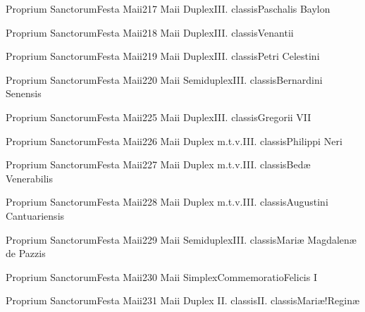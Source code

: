 \documentclass[liber-responsorialis_aestivus.tex]{subfiles}
\begin{document}
	{Proprium Sanctorum}{Festa Maii}{2}{17 Maii}
	{Duplex}{III. classis}{Paschalis Baylon}
	{\conprubric}
	{\respdetemp}

	{Proprium Sanctorum}{Festa Maii}{2}{18 Maii}
	{Duplex}{III. classis}{Venantii}
	{\mrtprubric}
	{\respdetemp}

	{Proprium Sanctorum}{Festa Maii}{2}{19 Maii}
	{Duplex}{III. classis}{Petri Celestini}
	{\coporubric}
	{\respdetemp}

	{Proprium Sanctorum}{Festa Maii}{2}{20 Maii}
	{Semiduplex}{III. classis}{Bernardini Senensis}
	{\conprubric}
	{\respdetemp}

	{Proprium Sanctorum}{Festa Maii}{2}{25 Maii}
	{Duplex}{III. classis}{Gregorii VII}
	{\coporubric}
	{\respdetemp}

	{Proprium Sanctorum}{Festa Maii}{2}{26 Maii}
	{Duplex m.t.v.}{III. classis}{Philippi Neri}
	{\conprubric}
	{\respdetemp}

	{Proprium Sanctorum}{Festa Maii}{2}{27 Maii}
	{Duplex m.t.v.}{III. classis}{Bedæ Venerabilis}
	{\conpdorubric}
	{\respdetemp}

	{Proprium Sanctorum}{Festa Maii}{2}{28 Maii}
	{Duplex m.t.v.}{III. classis}{Augustini Cantuariensis}
	{\coporubric}
	{\respdetemp}

	{Proprium Sanctorum}{Festa Maii}{2}{29 Maii}
	{Semiduplex}{III. classis}{Mariæ Magdalenæ de Pazzis}
	{\vnrubric}
	{\respdetemp}

	{Proprium Sanctorum}{Festa Maii}{2}{30 Maii}
	{Simplex}{Commemoratio}{Felicis I}
	{}
	{}
\rubric{\respdetemp}

	{Proprium Sanctorum}{Festa Maii}{2}{31 Maii}
	{Duplex II. classis}{II. classis}{Mariæ!Reginæ}
	{}
	{}
\end{document}
